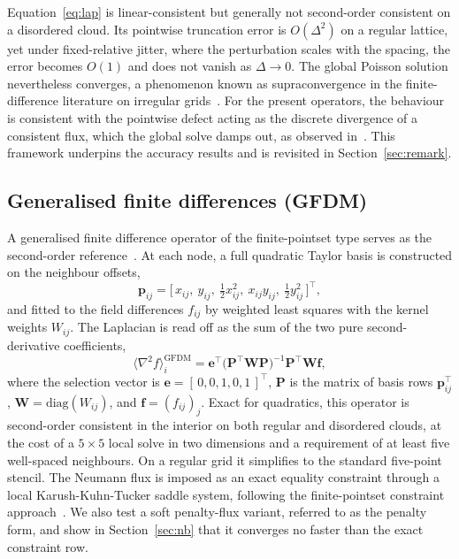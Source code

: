 \documentclass[preprint,review,12pt]{elsarticle}
\newcommand{\lap}[1]{\langle\nabla^2 #1\rangle}
\begin{document}
Equation~\eqref{eq:lap} is linear-consistent but generally not second-order consistent on a disordered cloud.
Its pointwise truncation error is $O(\Delta^2)$ on a regular lattice, yet under fixed-relative jitter, where the perturbation scales with the spacing, the error becomes $O(1)$ and does not vanish as $\Delta\to0$.
The global Poisson solution nevertheless converges, a phenomenon known as supraconvergence in the finite-difference literature on irregular grids~\cite{Kreiss1986,Manteuffel1986}.
For the present operators, the behaviour is consistent with the pointwise defect acting as the discrete divergence of a consistent flux, which the global solve damps out, as observed in~\cite{Basic2018}.
This framework underpins the accuracy results and is revisited in Section~\ref{sec:remark}.

\subsection{Generalised finite differences (GFDM)}
\label{sec:op-gfdm}

A generalised finite difference operator of the finite-pointset type serves as the second-order reference~\cite{Benito2001,Kuhnert2001,Tiwari2003}.
At each node, a full quadratic Taylor basis is constructed on the neighbour offsets,
\begin{equation}
  \mathbf p_{ij}=\big[\,x_{ij},\ y_{ij},\ \tfrac12 x_{ij}^2,\ x_{ij}y_{ij},\ \tfrac12 y_{ij}^2\,\big]^\top,
  \label{eq:gfdmbasis}
\end{equation}
and fitted to the field differences $f_{ij}$ by weighted least squares with the kernel weights $W_{ij}$.
The Laplacian is read off as the sum of the two pure second-derivative coefficients,
\begin{equation}
  \lap{f}_i^{\mathrm{GFDM}}=\mathbf e^\top\big(\mathbf P^\top\mathbf W\mathbf P\big)^{-1}
                            \mathbf P^\top\mathbf W\mathbf f,
  \label{eq:gfdm}
\end{equation}
where the selection vector is $\mathbf e=[\,0,0,1,0,1\,]^\top$, $\mathbf P$ is the matrix of basis rows $\mathbf p_{ij}^\top$, $\mathbf W=\mathrm{diag}(W_{ij})$, and $\mathbf f=(f_{ij})_j$.
Exact for quadratics, this operator is second-order consistent in the interior on both regular and disordered clouds, at the cost of a $5\times5$ local solve in two dimensions and a requirement of at least five well-spaced neighbours.
On a regular grid it simplifies to the standard five-point stencil.
The Neumann flux is imposed as an exact equality constraint through a local Karush-Kuhn-Tucker saddle system, following the finite-pointset constraint approach~\cite{Kuhnert2001,Tiwari2003}.
We also test a soft penalty-flux variant, referred to as the penalty form, and show in Section~\ref{sec:nb} that it converges no faster than the exact constraint row.
\end{document}
